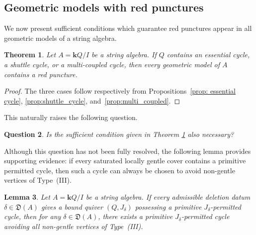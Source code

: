 \documentclass[11pt]{amsart}
\numberwithin{equation}{section}
\newtheorem{theorem}{Theorem}[section]
\newtheorem{lemma}[theorem]{Lemma}
\newtheorem{question}[theorem]{Question}
\theoremstyle{definition}
\begin{document}
\subsection{Geometric models with red punctures}

We now present sufficient conditions which guarantee red punctures appear in all geometric models of a string algebra.



\begin{theorem}\label{thm: all-red puncture}
    Let \(A=\mathbf{k}Q/I\) be a string algebra. If \(Q\) contains an
essential cycle, a shuttle cycle, or a multi-coupled cycle, then every geometric model of \(A\) contains a red
puncture.
\end{theorem}
\begin{proof}
The three cases follow respectively from
Propositions~\ref{prop: essential cycle},
\ref{prop:shuttle_cycle}, and~\ref{prop:multi_coupled}.
\end{proof}
This naturally raises the following question.

\begin{question}
    Is the sufficient condition given in Theorem \ref{thm: all-red puncture} also necessary?
\end{question}
Although this question has not been fully resolved, the following lemma provides supporting evidence: if every saturated locally gentle cover contains a primitive permitted cycle, then such a cycle can always be chosen to avoid  non-gentle vertices of Type~\textup{(III)}.

\begin{lemma}\label{lem:type-III-elimination}
Let \(A=\mathbf{k}Q/I\) be a string algebra. If every admissible deletion datum \(\delta\in\mathfrak D(A)\) gives a bound quiver \((Q,J_\delta)\) possessing a primitive \(J_\delta\)-permitted cycle, then for any \(\delta\in\mathfrak D(A)\), there exists a primitive \(J_\delta\)-permitted cycle avoiding all  non-gentle vertices of Type~\textup{(III)}.
\end{lemma}
\end{document}
